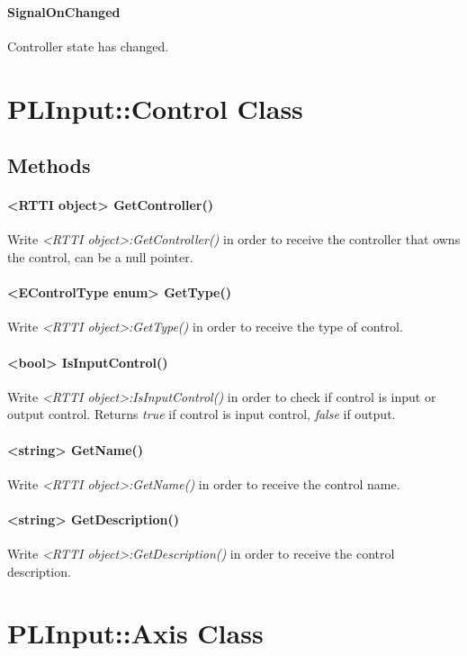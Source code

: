 \paragraph{SignalOnChanged}
Controller state has changed.




\section{PLInput::Control Class}


\subsection{Methods}

\paragraph{<RTTI object> GetController()}
Write \emph{<RTTI object>:GetController()} in order to receive the controller that owns the control, can be a null pointer.

\paragraph{<EControlType enum> GetType()}
Write \emph{<RTTI object>:GetType()} in order to receive the type of control.

\paragraph{<bool> IsInputControl()}
Write \emph{<RTTI object>:IsInputControl()} in order to check if control is input or output control. Returns \emph{true} if control is input control, \emph{false} if output.

\paragraph{<string> GetName()}
Write \emph{<RTTI object>:GetName()} in order to receive the control name.

\paragraph{<string> GetDescription()}
Write \emph{<RTTI object>:GetDescription()} in order to receive the control description.




\section{PLInput::Axis Class}


